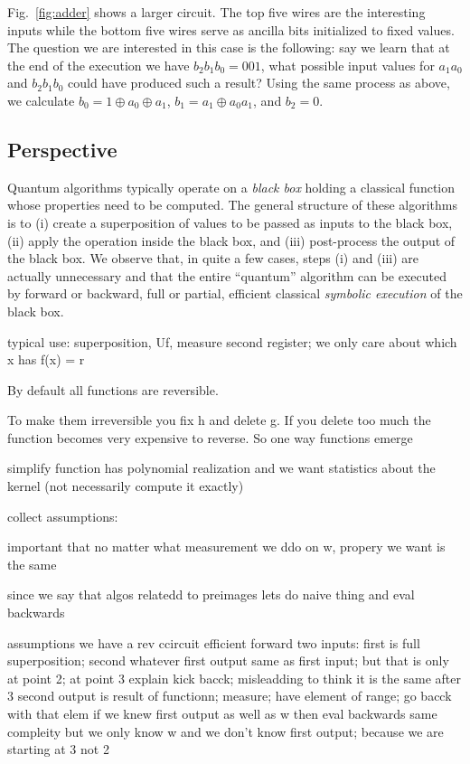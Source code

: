 \documentclass{article}
\begin{document}
Fig.~\ref{fig:adder} shows a larger circuit. The top five wires are
the interesting inputs while the bottom five wires serve as ancilla
bits initialized to fixed values. The question we are interested in
this case is the following: say we learn that at the end of the
execution we have $b_2b_1b_0 = 001$, what possible input values for
$a_1a_0$ and $b_2b_1b_0$ could have produced such a result? Using the
same process as above, we calculate $b_0 = 1 \oplus a_0 \oplus a_1$,
$b_1 = a_1 \oplus a_0a_1$, and $b_2 = 0$.

\subsection{Perspective}

Quantum algorithms typically operate on a \emph{black box} holding a
classical function whose properties need to be computed. The general
structure of these algorithms is to (i) create a superposition of
values to be passed as inputs to the black box, (ii) apply the
operation inside the black box, and (iii) post-process the output of
the black box. We observe that, in quite a few cases, steps (i) and
(iii) are actually unnecessary and that the entire ``quantum''
algorithm can be executed by forward or backward, full or partial,
efficient classical \emph{symbolic execution} of the black box.


typical use: superposition, Uf, measure second register; we only care
about which x has f(x) = r

By default all functions are reversible. 

To make them irreversible you fix h and delete g. If you delete too
much the function becomes very expensive to reverse. So one way
functions emerge


simplify function has polynomial realization and we want
statistics about the kernel (not necessarily compute it exactly)



collect assumptions:


important that no matter what measurement we ddo on w, propery we want is the same


since we say that algos relatedd to preimages lets do naive thing and eval backwards

assumptions we have a rev ccircuit efficient forward
two inputs: first is full superposition; second whatever
first output same as first input; but that is only at point 2; at point 3 explain kick bacck; misleadding to think it is the same after 3
second output is result of functionn; measure; have element of range; go bacck with that elem
if we knew first output as well as w then eval backwards same compleity but we only know w and we don't know first output; because we are starting at 3 not 2
\end{document}
